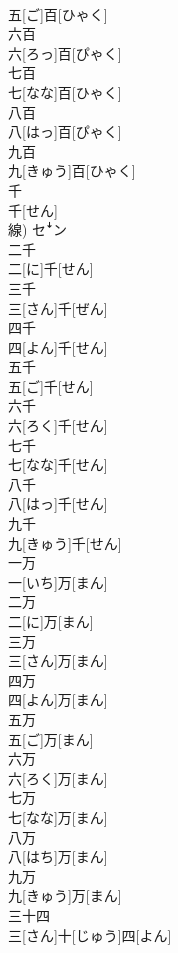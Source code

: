 \documentclass[8pt]{extreport}
\begin{document}
\begin{CJK}{UTF8}{min}
\\	五[ご]百[ひゃく]
\\	六百	
\\	六[ろっ]百[ぴゃく]	
\\	七百	
\\	七[なな]百[ひゃく]
\\	八百	
\\	八[はっ]百[ぴゃく]	
\\	九百	
\\	九[きゅう]百[ひゃく]
\\	千	
\\	千[せん] 
\\	線)	セꜜン
\\	二千	
\\	二[に]千[せん]
\\	三千	
\\	三[さん]千[ぜん]
\\	四千	
\\	四[よん]千[せん]	
\\	五千	
\\	五[ご]千[せん]
\\	六千	
\\	六[ろく]千[せん]	
\\	七千	
\\	七[なな]千[せん]
\\	八千	
\\	八[はっ]千[せん]	
\\	九千	
\\	九[きゅう]千[せん]
\\	一万	
\\	一[いち]万[まん]
\\	二万	
\\	二[に]万[まん]
\\	三万	
\\	三[さん]万[まん]
\\	四万	
\\	四[よん]万[まん]	
\\	五万	
\\	五[ご]万[まん]
\\	六万	
\\	六[ろく]万[まん]	
\\	七万	
\\	七[なな]万[まん]
\\	八万	
\\	八[はち]万[まん]	
\\	九万	
\\	九[きゅう]万[まん]
\\	三十四	
\\	三[さん]十[じゅう]四[よん]

\end{CJK}
\end{document}
